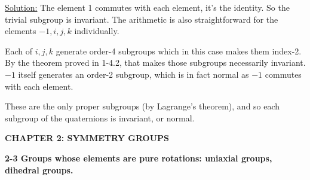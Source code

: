 \documentclass[12pt]{article}
\begin{document}
\underline{Solution:} The element 1 commutes with each element, it's the
identity. So the trivial subgroup is invariant. The arithmetic is also
straightforward for the elements $-1, i, j, k$ individually. 

Each of $i,j,k$ generate order-4 subgroups which in this case makes them
index-2. By the theorem proved in 1-4.2, that makes those subgroups
necessarily invariant.  $-1$ itself generates an order-2 subgroup, which is in
fact normal as $-1$ commutes with each element.

These are the only proper subgroups (by Lagrange's theorem), and so each
subgroup of the quaternions is invariant, or normal.

\newpage

\textbf{CHAPTER 2: SYMMETRY GROUPS}

\textbf{2-3 Groups whose elements are pure rotations: uniaxial groups, dihedral
groups.}
\end{document}
